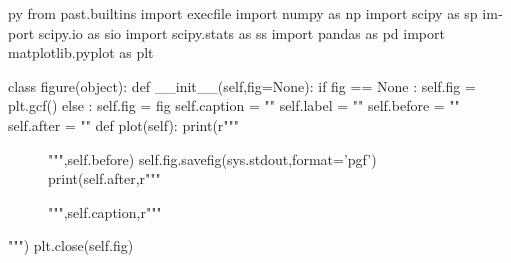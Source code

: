 \usepackage[headheight=14pt, top=0.5cm, bottom=0.5cm, left=.5cm, right=.5cm]{geometry}

\usepackage{fontspec}

\usepackage{polyglossia}
\setdefaultlanguage{english}
\usepackage{amsmath, amssymb}
\usepackage{graphicx}
\usepackage{pgf}
\usepackage{import}

\usepackage[outputdir=build]{minted}
\usepackage{minted}


\usepackage{pythontex}
\begin{pythontexcustomcode}{py}
from past.builtins import execfile
import numpy as np
import scipy as sp
import scipy.io as sio
import scipy.stats as ss
import pandas as pd
import matplotlib.pyplot as plt

class figure(object):
	def __init__(self,fig=None):
		if fig == None :
			self.fig = plt.gcf()
		else :
			self.fig = fig
		self.caption = ""
		self.label = ""
		self.before = ""
		self.after = ""
	def plot(self):
		print(r"""
		\begin{figure}[ht]
			\centering
			""",self.before)
		self.fig.savefig(sys.stdout,format='pgf')
		print(self.after,r"""
			\caption{""",self.caption,r"""}%
			\label{fig:""",self.label,r"""}
		\end{figure}
		""")
		plt.close(self.fig)


\end{pythontexcustomcode}



\setlength\parindent{0pt}
